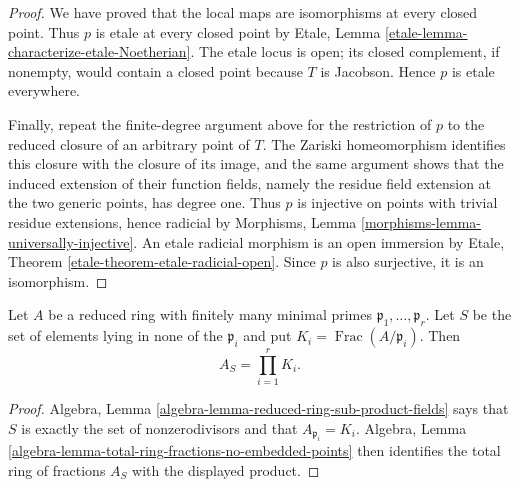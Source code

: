 \begin{proof}
We have proved that the local maps are isomorphisms at every closed point.
Thus $p$ is etale at every closed point by Etale, Lemma
\ref{etale-lemma-characterize-etale-Noetherian}. The etale locus is open; its
closed complement, if nonempty, would contain a closed point because $T$ is
Jacobson. Hence $p$ is etale everywhere.

Finally, repeat the finite-degree argument above for the restriction of $p$ to
the reduced closure of an arbitrary point of $T$. The Zariski homeomorphism
identifies this closure with the closure of its image, and the same argument
shows that the induced extension of their function fields, namely the residue
field extension at the two generic points, has degree one. Thus $p$ is
injective on points with trivial residue extensions, hence radicial by
Morphisms, Lemma \ref{morphisms-lemma-universally-injective}. An etale
radicial morphism is an open immersion by Etale, Theorem
\ref{etale-theorem-etale-radicial-open}. Since $p$ is also surjective, it is an
isomorphism.
\end{proof}

\begin{lemma}
\label{lemma-total-fractions-reduced}
Let $A$ be a reduced ring with finitely many minimal primes
$\mathfrak p_1,\ldots,\mathfrak p_r$. Let $S$ be the set of elements lying in
none of the $\mathfrak p_i$ and put
$K_i=\operatorname{Frac}(A/\mathfrak p_i)$. Then
$$
A_S=\prod_{i=1}^rK_i.
$$
\end{lemma}

\begin{proof}
Algebra, Lemma \ref{algebra-lemma-reduced-ring-sub-product-fields} says that
$S$ is exactly the set of nonzerodivisors and that
$A_{\mathfrak p_i}=K_i$. Algebra, Lemma
\ref{algebra-lemma-total-ring-fractions-no-embedded-points} then identifies
the total ring of fractions $A_S$ with the displayed product.
\end{proof}


